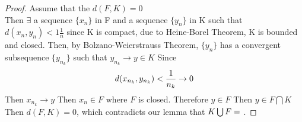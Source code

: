 \documentclass{article}[12 pt]
\begin{document}
\begin{enumerate}
	      \begin{proof}
		      Assume that the $d(F,K) = 0$\\
		      Then $\exists$ a sequence $\{x_n\}$ in F and a sequence $\{y_n\}$ in K such that $d(x_n,y_n) <1 \frac{1}{n}$
		      since K is compact, due to Heine-Borel Theorem, K is bounded and closed.
		      Then, by Bolzano-Weierstrauss Theorem, $\{y_n\}$ has a convergent subsequence $\{y_{n_k}\}$ such that $y_{n_k} \to y \in K$
		      Since
		      \begin{equation}
			      d(x_{n_k},y_{n_k}) < \frac{1}{n_k} \to 0\\
		      \end{equation}
		      Then $x_{n_k} \to y$
		      Then $x_n \in F$ where $F$ is closed.
		      Therefore $y \in F$
		      Then $y \in F\bigcap K$
		      Then $d(F,K) = 0$, which contradicts our lemma that $K\bigcup F = \null$.
	      \end{proof}


\end{enumerate}
\end{document}
